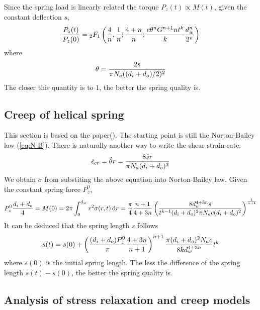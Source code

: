 \documentclass[10pt]{article}
\begin{document}
Since the spring load is linearly related the torque $P_z(t)\propto M(t)$, given the constant deflection $s$,
\[
{P_z(t)\over P_z(0)} = {}_{2}F_1 \left( {4\over n},{1\over n};{4+n\over n};{c\theta^n G^{n+1} n t^k\over k} {d_w^n\over 2^n}\right)
\]
where
\[
\theta = {2s\over \pi N_a ((d_i+d_o)/2)^2}
\]
The closer this quantity is to $1$, the better the spring quality is.

\subsection{Creep of helical spring}
This section is based on the paper(\cite{Ko2014}). The starting point is still the Norton-Bailey law (\ref{eq:N-B}). There is naturally another way to write the shear strain rate:
\[
\dot{\epsilon}_{cr} = \dot{\theta} r = {8\dot{s} r\over \pi N_a (d_i+d_o)^2}
\]
We obtain $\sigma$ from substiting the above equation into Norton-Bailey law. Given the constant spring force $P_z^0$,
\[
P_z^0{d_i+d_o\over 4}=M(0)=2\pi\int_0^{d_w} r^2 \sigma(r,t)\,\mathrm{d} r
={\pi\over 4}{n+1\over 4+3n}\left( {8d_w^{4+3n}\dot{s} \over t^{k-1} (d_i+d_o)^2 \pi N_a c (d_i+d_o)^2} \right)^{{1\over n+1}}
\]
It can be deduced that the spring length $s$ follows
\[
s(t) = s(0) + \left( {(d_i+d_o)P_z^0\over \pi}{4+3n\over n+1} \right)^{n+1} {\pi (d_i+d_o)^2 N_a c\over 8kd_w^{4+3n}} t^k
\]
where $s(0)$ is the initial spring length. The less the difference of the spring length $s(t)-s(0)$, the better the spring quality is.
 
 \cite{Ch2000} \cite{Relaxation1} \cite{Relaxation2} \cite{Relaxation3} \cite{Creep} 
\subsection{Analysis of stress relaxation and creep models}
\label{sec:stressanalysis}




\vfill\pagebreak


	
	


\end{document}
